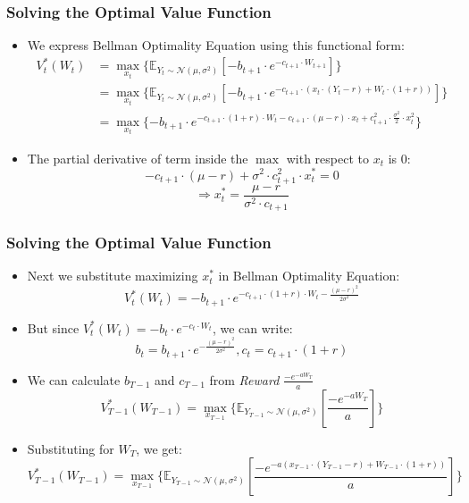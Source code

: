 \documentclass[handout]{beamer}
\begin{document}
\begin{frame}
\frametitle{Solving the Optimal Value Function}
\pause
\begin{itemize}[<+->]
\item We express Bellman Optimality Equation using this functional form:
\begin{equation*}
\begin{split}
V^*_t(W_t) & = \max_{x_t} \{ \mathbb{E}_{Y_t \sim \mathcal{N}(\mu, \sigma^2)} [-b_{t+1} \cdot e^{-c_{t+1} \cdot W_{t+1}}] \} \\
& = \max_{x_t} \{ \mathbb{E}_{Y_t \sim \mathcal{N}(\mu, \sigma^2)} [-b_{t+1} \cdot e^{-c_{t+1} \cdot (x_t \cdot (Y_t - r) + W_t \cdot (1+r))}] \} \\
& = \max_{x_t} \{-b_{t+1} \cdot e^{-c_{t+1} \cdot (1 + r) \cdot W_t - c_{t+1} \cdot (\mu - r) \cdot x_t + c^2_{t+1} \cdot \frac {\sigma^2} {2} \cdot x_t^2} \}
\end{split}
\end{equation*}
\item The partial derivative of term inside the $\max$ with respect to $x_t$ is 0:
$$ -c_{t+1} \cdot (\mu - r) + \sigma^2 \cdot c^2_{t+1} \cdot x^*_t = 0$$
\begin{equation}
\Rightarrow x^*_t = \frac {\mu - r} {\sigma^2 \cdot c_{t+1}}
\label{eq:pi-star-functional-discrete}
\end{equation}
\end{itemize}
\end{frame}

\begin{frame}
\frametitle{Solving the Optimal Value Function}
\pause
\begin{itemize}[<+->]
\item Next we substitute maximizing $x_t^*$ in Bellman Optimality Equation:
$$V^*_t(W_t) = - b_{t+1} \cdot e^{-c_{t+1} \cdot (1 + r) \cdot W_t - \frac {(\mu - r)^2} {2 \sigma^2}} $$
\item But since $V^*_t(W_t) = -b_t \cdot e^{-c_t \cdot W_t}$, we can write:
$$b_t = b_{t+1} \cdot e^{- \frac {(\mu -r)^2} {2 \sigma^2}}, c_t = c_{t+1} \cdot (1 + r)$$
\item We can calculate $b_{T-1}$ and $c_{T-1}$ from {\em Reward} $\frac {- e^{-a W_T}} a$
$$V^*_{T-1}(W_{T-1}) = \max_{x_{T-1}} \{ \mathbb{E}_{Y_{T-1} \sim \mathcal{N}(\mu, \sigma^2)}[\frac {- e^{-a W_T}} a] \}$$
\item Substituting for $W_T$, we get:
$$V^*_{T-1}(W_{T-1}) = \max_{x_{T-1}} \{ \mathbb{E}_{Y_{T-1} \sim \mathcal{N}(\mu, \sigma^2)}[\frac {- e^{-a (x_{T-1}\cdot (Y_{T-1} - r) + W_{T-1} \cdot (1 + r))}} a] \}$$
\end{itemize}
\end{frame}
\end{document}

